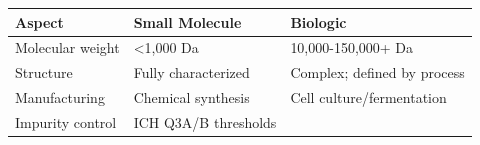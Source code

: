 \documentclass[
  11pt,
  a4paper,
]{report}
\begin{document}
\begin{longtable}[]{@{}lll@{}}
\toprule
\begin{minipage}[b]{0.22\columnwidth}\raggedright
Aspect\strut
\end{minipage} & \begin{minipage}[b]{0.41\columnwidth}\raggedright
Small Molecule\strut
\end{minipage} & \begin{minipage}[b]{0.28\columnwidth}\raggedright
Biologic\strut
\end{minipage}\tabularnewline
\midrule
\endhead
\begin{minipage}[t]{0.22\columnwidth}\raggedright
Molecular weight\strut
\end{minipage} & \begin{minipage}[t]{0.41\columnwidth}\raggedright
\textless1,000 Da\strut
\end{minipage} & \begin{minipage}[t]{0.28\columnwidth}\raggedright
10,000-150,000+ Da\strut
\end{minipage}\tabularnewline
\begin{minipage}[t]{0.22\columnwidth}\raggedright
Structure\strut
\end{minipage} & \begin{minipage}[t]{0.41\columnwidth}\raggedright
Fully characterized\strut
\end{minipage} & \begin{minipage}[t]{0.28\columnwidth}\raggedright
Complex; defined by process\strut
\end{minipage}\tabularnewline
\begin{minipage}[t]{0.22\columnwidth}\raggedright
Manufacturing\strut
\end{minipage} & \begin{minipage}[t]{0.41\columnwidth}\raggedright
Chemical synthesis\strut
\end{minipage} & \begin{minipage}[t]{0.28\columnwidth}\raggedright
Cell culture/fermentation\strut
\end{minipage}\tabularnewline
\begin{minipage}[t]{0.22\columnwidth}\raggedright
Impurity control\strut
\end{minipage} & \begin{minipage}[t]{0.41\columnwidth}\raggedright
ICH Q3A/B thresholds\strut
\end{minipage} & \begin{minipage}[t]{0.28\columnwidth}\raggedright

\end{minipage}
\end{longtable}
\end{document}

